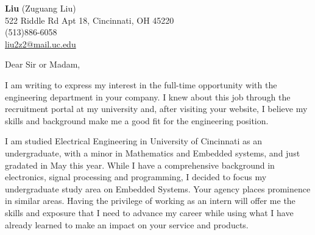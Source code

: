 \documentclass[11pt]{letter} %
\begin{document}

\begin{letter}
    {\vspace{-15pt}}


    \begin{center}
        \large \textbf{Liu} (Zuguang Liu) \\ %
        522 Riddle Rd Apt 18, Cincinnati, OH 45220 \\ (513)886-6058  \\ \href{mailto:liu2z2@mail.uc.edu}{liu2z2@mail.uc.edu}%
    \end{center}


    \signature{Liu (Zuguang Liu)} %


    \opening{Dear Sir or Madam,}

    \par I am writing to express my interest in the full-time opportunity with the engineering department in your company.
    I knew about this job through the recruitment portal at my university and, after visiting your website, I believe my skills and background make me a good fit for the engineering position.

    \par I am studied Electrical Engineering in University of Cincinnati as an undergraduate, with a minor in Mathematics and Embedded systems, and just gradated in May this year.
    While I have a comprehensive background in electronics, signal processing and programming, I decided to focus my undergraduate study area on Embedded Systems.
    Your agency places prominence in similar areas.
    Having the privilege of working as an intern will offer me the skills and exposure that I need to advance my career while using what I have already learned to make an impact on your service and products.


\end{letter}
\end{document}
